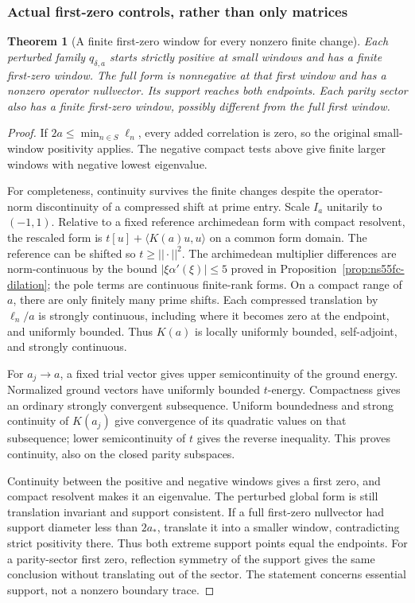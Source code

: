 \documentclass[11pt]{article}
\def\norm#1{||#1||}%
\newtheorem{theorem}{Theorem}[section]
\theoremstyle{remark}
\newcommand{\norm}[1]{\left\lVert #1\right\rVert}
\begin{document}
\subsubsection{Actual first-zero controls, rather than only matrices}
\begin{theorem}[A finite first-zero window for every nonzero finite change]\label{thm:ns57-first-zero-controls}
Each perturbed family $q_{\delta,a}$ starts strictly positive at small
windows and has a finite first-zero window. The full form is nonnegative
at that first window and has a nonzero operator nullvector. Its support
reaches both endpoints. Each parity sector also has a finite first-zero
window, possibly different from the full first window.
\end{theorem}
\begin{proof}
If $2a\le\min_{n\in S}\ell_n$, every added correlation is zero, so the
original small-window positivity applies. The negative compact tests
above give finite larger windows with negative lowest eigenvalue.

For completeness, continuity survives the finite changes despite the
operator-norm discontinuity of a compressed shift at prime entry.
Scale $I_a$ unitarily to $(-1,1)$. Relative to a fixed reference
archimedean form with compact resolvent, the rescaled form is
$t[u]+\langle K(a)u,u\rangle$ on a common form domain.
The reference can be shifted so $t\ge\norm{\cdot}^2$.
The archimedean multiplier differences are norm-continuous by the
bound $|\xi\alpha'(\xi)|\le5$ proved in Proposition~\ref{prop:ns55fc-dilation}; the pole terms are continuous
finite-rank forms. On a compact range of $a$, there are only finitely
many prime shifts. Each compressed translation by $\ell_n/a$ is
strongly continuous, including where it becomes zero at the endpoint,
and uniformly bounded. Thus $K(a)$ is locally uniformly bounded,
self-adjoint, and strongly continuous.

For $a_j\to a$, a fixed trial vector gives upper semicontinuity of
the ground energy. Normalized ground vectors have uniformly bounded
$t$-energy. Compactness gives an ordinary strongly convergent
subsequence. Uniform boundedness and strong continuity of $K(a_j)$
give convergence of its quadratic values on that subsequence; lower
semicontinuity of $t$ gives the reverse inequality. This proves
continuity, also on the closed parity subspaces.

Continuity between the positive and negative windows gives a first
zero, and compact resolvent makes it an eigenvalue. The perturbed
global form is still translation invariant and support consistent.
If a full first-zero nullvector had support diameter less than $2a_*$,
translate it into a smaller window, contradicting strict positivity
there. Thus both extreme support points equal the endpoints.
For a parity-sector first zero, reflection symmetry of the support
gives the same conclusion without translating out of the sector.
The statement concerns essential support, not a nonzero boundary trace.
\end{proof}
\end{document}
